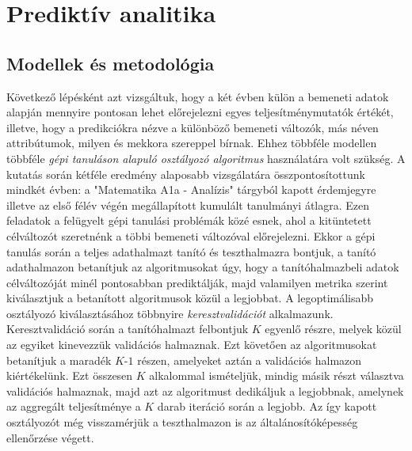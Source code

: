 \documentclass[12pt]{article}
\begin{document}
\newpage
\section{Prediktív analitika}

\subsection{Modellek és metodológia}

Következő lépésként azt vizsgáltuk, hogy a két évben külön a bemeneti adatok alapján mennyire pontosan lehet előrejelezni egyes teljesítménymutatók értékét, illetve, hogy a predikciókra nézve a különböző bemeneti változók, más néven attribútumok, milyen és mekkora szereppel bírnak. Ehhez többféle modellen többféle \textit{gépi tanuláson alapuló osztályozó algoritmus} használatára volt szükség. A kutatás során kétféle eredmény alaposabb vizsgálatára összpontosítottunk mindkét évben: a "Matematika A1a - Analízis" tárgyból kapott érdemjegyre illetve az első félév végén megállapított kumulált tanulmányi átlagra. Ezen feladatok a felügyelt gépi tanulási problémák közé esnek, ahol a kitüntetett célváltozót szeretnénk a többi bemeneti változóval előrejelezni\cite{bevadat}. Ekkor a gépi tanulás során a teljes adathalmazt tanító és teszthalmazra bontjuk, a tanító adathalmazon betanítjuk az algoritmusokat úgy, hogy a tanítóhalmazbeli adatok célváltozóját minél pontosabban prediktálják, majd valamilyen metrika szerint kiválasztjuk a betanított algoritmusok közül a legjobbat. A legoptimálisabb osztályozó kiválasztásához többnyire \textit{keresztvalidációt} alkalmazunk. Keresztvalidáció során a tanítóhalmazt felbontjuk $K$ egyenlő részre, melyek közül az egyiket kinevezzük validációs halmaznak. Ezt követően az algoritmusokat betanítjuk a maradék $K$-$1$ részen, amelyeket aztán a validációs halmazon kiértékelünk. Ezt összesen $K$ alkalommal ismételjük, mindig másik részt választva validációs halmaznak, majd azt az algoritmust dedikáljuk a legjobbnak, amelynek az aggregált teljesítménye a $K$ darab iteráció során a legjobb. Az így kapott osztályozót még visszamérjük a teszthalmazon is az általánosítóképesség ellenőrzése végett. %
\end{document}
